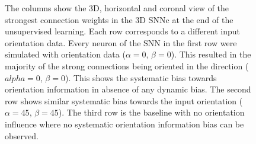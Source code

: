 \begin{figure}
	\caption{The columns show the 3D, horizontal and coronal view of the strongest connection weights in the 3D SNNc at the end of the unsupervised learning. Each row corresponds to a different input orientation data. Every neuron of the SNN in the first row were simulated with orientation data ($\alpha=0$\textdegree, $\beta=0$\textdegree). This resulted in the majority of the strong connections being oriented in the direction ($alpha=0$\textdegree, $\beta=0$\textdegree). This shows the systematic bias towards orientation information in absence of any dynamic bias. The second row shows similar systematic bias towards the input orientation ($\alpha=45$\textdegree, $\beta=45$\textdegree). The third row is the baseline with no orientation influence where no systematic orientation information bias can be observed.}

\end{figure}
